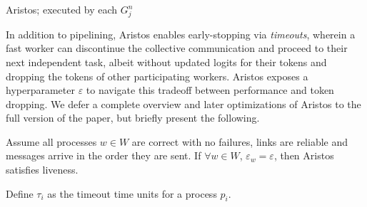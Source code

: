\begin{algorithm}[!h]
    \DontPrintSemicolon
    \scriptsize
    \caption{Aristos; executed by each $G_j^n$}\label{alg:two}
\end{algorithm}
In addition to pipelining, Aristos enables early-stopping via \emph{timeouts}, wherein a fast worker can discontinue the
collective communication and proceed to their next independent task,
albeit without updated logits for their tokens and dropping the tokens of other participating workers.
Aristos exposes a hyperparameter $\varepsilon$ to navigate this tradeoff between performance and token dropping.
We defer a complete overview and later optimizations of Aristos to the full version of the paper,
but briefly present the following.
\begin{theorem}\label{theo}
    Assume all processes $w \in W$ are correct with no failures, links are
    reliable and messages arrive in the order they are sent.
    If $\forall w \in W$, $\varepsilon_w = \varepsilon$, then Aristos satisfies liveness.
\end{theorem}
Define $\tau_i$ as the timeout time units for a process $p_i$.
